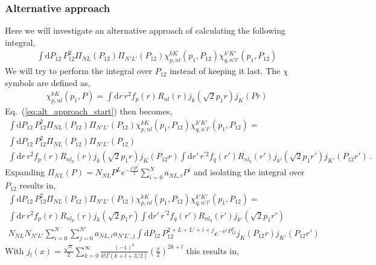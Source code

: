 \documentclass[10pt]{article}
\begin{document}
\subsubsection{Alternative approach}
Here we will investigate an alternative approach of calculating the following 
integral,
\begin{align}
\int \text{d} P_{12} \, P_{12}^{2} \Pi_{N L}(P_{12}) \Pi_{N' L'}(P_{12}) 
\chi_{p,nl}^{kK}(p_1,P_{12}) \chi_{q,n'l'}^{k'K'}(p_1,P_{12}) 
\label{eq:alt_approach_start}
\end{align}
We will try to perform the integral over $P_{12}$ instead of keeping it last.
The $\chi$ symbols are defined as,
\begin{align*}
	\chi_{p,nl}^{kK}(p_1,P) = \int \text{d} r\, r^{2} f_{p}(r) R_{n l}(r) 
j_{k}( \sqrt{2} p_1 r)  j_{K}(P r)
\end{align*}
Eq.~(\ref{eq:alt_approach_start}) then becomes,
\begin{multline*}
\int \text{d} P_{12} \, P_{12}^{2} \Pi_{N L}(P_{12}) \Pi_{N' L'}(P_{12}) 
\chi_{p,nl}^{kK}(p_1,P_{12}) \chi_{q,n'l'}^{k'K'}(p_1,P_{12}) = \\
 \int \text{d} P_{12} \, P_{12}^{2} \Pi_{N L}(P_{12}) \Pi_{N' L'}(P_{12}) \\
 \int \text{d} r\, r^{2} f_{p}(r) R_{n l_p}(r) j_{k}( \sqrt{2} p_1 r)  
j_{K}(P_{12} r) 
 \int \text{d} r' \, r^{\prime 2} f_{q}(r') R_{n l_q}(r') j_{k'}( \sqrt{2} p_1 
r')  j_{K'}(P_{12} r') \, .
\end{multline*}
Expanding $\Pi_{NL}(P) = N_{NL} P^{L} e^{-\frac{\nu' P^{2}}{2}} \sum_{i=0}^{N} 
a_{NL,i} P^{i}$ and isolating the integral over $P_{12}$ results in,
\begin{multline*}
\int \text{d} P_{12} \, P_{12}^{2} \Pi_{N L}(P_{12}) \Pi_{N' L'}(P_{12}) 
\chi_{p,nl}^{kK}(p_1,P_{12}) \chi_{q,n'l'}^{k'K'}(p_1,P_{12}) = \\
 \int \text{d} r\, r^{2} f_{p}(r) R_{n l_p}(r) j_{k}( \sqrt{2} p_1 r)  
 \int \text{d} r' \, r^{\prime 2} f_{q}(r') R_{n l_q}(r') j_{k'}( \sqrt{2} p_1 
r')   \\
  N_{NL} N_{N'L'} \sum_{i=0}^{N} \sum_{j=0}^{N'} a_{NL,i}  a_{N'L',j} 
 \int \text{d} P_{12} \, P_{12}^{2+L+L'+i+j} e^{-\nu' P_{12}^{2}} j_{K}(P_{12} 
r) j_{K'}(P_{12} r')
\end{multline*}
With $j_{l}(x) = \frac{\sqrt{\pi}}{2} \sum_{k=0}^{\infty} \frac{(-1)^{k}}{k! 
\Gamma(k+l+3/2)} \left( \frac{x}{2} \right)^{2k+l}$ this results in,
\end{document}
